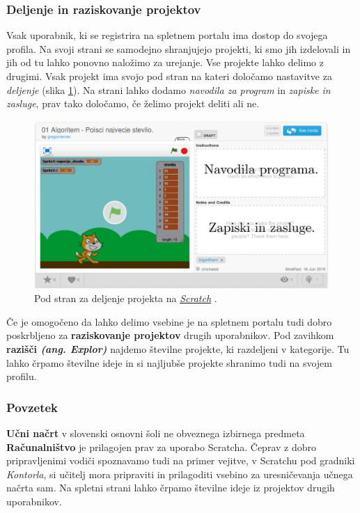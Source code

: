 \subsubsection{Deljenje in raziskovanje projektov}
\label{sec:deljenje_vsebin}

Vsak uporabnik, ki se registrira na spletnem portalu ima dostop do
svojega profila. Na svoji strani se samodejno shranjujejo projekti, ki
smo jih izdelovali in jih od tu lahko ponovno naložimo za
urejanje. Vse projekte lahko delimo z drugimi. Vsak projekt ima svojo
pod stran na kateri določamo nastavitve za \emph{deljenje} (slika
\ref{fig:web:scratch:deljenje}). Na strani lahko dodamo \emph{navodila
  za program} in \emph{zapiske in zasluge}, prav tako določamo, če
želimo projekt deliti ali ne.

\begin{figure}[h!]
  \centering
    \includegraphics [width=0.50\linewidth, keepaspectratio =
   1] {./images/sc_web/scratch_deljenje-v01o.png}
   \caption{Pod stran za deljenje projekta na
     \emph{\href{https://scratch.mit.edu/}{Scratch}}
     \cite{web:scratch}.}
    \label{fig:web:scratch:deljenje}
\end{figure}

Če je omogočeno da lahko delimo vsebine je na spletnem portalu tudi
dobro poskrbljeno za \textbf{raziskovanje projektov} drugih
uporabnikov. Pod zavihkom \textbf{razišči \emph{(ang. Explor)}}
najdemo številne projekte, ki razdeljeni v kategorije. Tu lahko črpamo
številne ideje in si najljubše projekte shranimo tudi na svojem
profilu.

\subsubsection{Povzetek}
\label{sec:scratch_povzetek}

\textbf{Učni načrt} v slovenski osnovni šoli ne obveznega izbirnega
predmeta \textbf{Računalništvo }je prilagojen prav za uporabo
Scratcha. Čeprav z dobro pripravljenimi vodiči spoznavamo tudi na
primer vejitve, v Scratchu pod gradniki \emph{Kontorla}, si učitelj
mora pripraviti in prilagoditi vsebino za uresničevanja učnega načrta
sam. Na spletni strani lahko črpamo številne ideje iz projektov drugih
uporabnikov.

